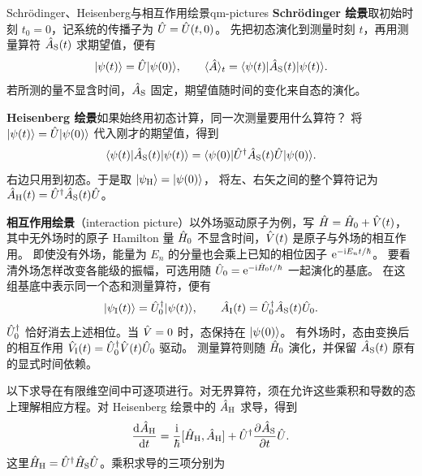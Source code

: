 \begin{definition}{Schrödinger、Heisenberg与相互作用绘景}{qm-pictures}
    \textbf{Schrödinger 绘景}\quad 取初始时刻 $t_0 = 0$，记系统的传播子为 $\hat{U} = \hat{U}(t,0)$。
    先把初态演化到测量时刻 $t$，再用测量算符 $\hat{A}_{\mathrm{S}}(t)$ 求期望值，便有
    \begin{equation}\label{eq:qm-schrodinger-picture}
        \lvert\psi(t)\rangle = \hat{U}\lvert\psi(0)\rangle,\qquad
        \langle\hat{A}\rangle_t = \langle\psi(t)\vert\hat{A}_{\mathrm{S}}(t)\vert\psi(t)\rangle .
    \end{equation}
    若所测的量不显含时间，$\hat{A}_{\mathrm{S}}$ 固定，期望值随时间的变化来自态的演化。

    \smallskip
    \textbf{Heisenberg 绘景}\quad 如果始终用初态计算，同一次测量要用什么算符？
    将 $\lvert\psi(t)\rangle = \hat{U}\lvert\psi(0)\rangle$ 代入刚才的期望值，得到
    \[
        \langle\psi(t)\vert\hat{A}_{\mathrm{S}}(t)\vert\psi(t)\rangle
        = \langle\psi(0)\vert\hat{U}^\dagger\hat{A}_{\mathrm{S}}(t)\hat{U}\vert\psi(0)\rangle .
    \]
    右边只用到初态。于是取 $\lvert\psi_{\mathrm{H}}\rangle = \lvert\psi(0)\rangle$，
    将左、右矢之间的整个算符记为 $\hat{A}_{\mathrm{H}}(t) = \hat{U}^\dagger\hat{A}_{\mathrm{S}}(t)\hat{U}$。

    \smallskip
    \textbf{相互作用绘景}（interaction picture）\quad 以外场驱动原子为例，写 $\hat{H} = \hat{H}_0 + \hat{V}(t)$，
    其中无外场时的原子 Hamilton 量 $\hat{H}_0$ 不显含时间，$\hat{V}(t)$ 是原子与外场的相互作用。
    即使没有外场，能量为 $E_n$ 的分量也会乘上已知的相位因子 $\mathop{}\!\mathrm{e}^{-\mathrm{i} E_n t/\hbar}$。
    要看清外场怎样改变各能级的振幅，可选用随 $\hat{U}_0 = \mathop{}\!\mathrm{e}^{-\mathrm{i}\hat{H}_0t/\hbar}$ 一起演化的基底。
    在这组基底中表示同一个态和测量算符，便有
    \begin{equation}
        \lvert\psi_{\mathrm{I}}(t)\rangle = \hat{U}_0^\dagger\lvert\psi(t)\rangle,\qquad
        \hat{A}_{\mathrm{I}}(t) = \hat{U}_0^\dagger\hat{A}_{\mathrm{S}}(t)\hat{U}_0 .
    \end{equation}
    $\hat{U}_0^\dagger$ 恰好消去上述相位。当 $\hat{V} = 0$ 时，态保持在 $\lvert\psi(0)\rangle$。
    有外场时，态由变换后的相互作用 $\hat{V}_{\mathrm{I}}(t) = \hat{U}_0^\dagger\hat{V}(t)\hat{U}_0$ 驱动。
    测量算符则随 $\hat{H}_0$ 演化，并保留 $\hat{A}_{\mathrm{S}}(t)$ 原有的显式时间依赖。
\end{definition}
以下求导在有限维空间中可逐项进行。对无界算符，须在允许这些乘积和导数的态上理解相应方程。对 Heisenberg 绘景中的 $\hat{A}_{\mathrm{H}}$ 求导，得到
\begin{equation}
    \frac{\mathop{}\!\mathrm{d}^{}\hat{A}_{\mathrm{H}}}{\mathrm{d}{t}^{}} = \frac{\mathrm{i}}\hbar[\hat{H}_{\mathrm{H}},\hat{A}_{\mathrm{H}}] + \hat{U}^\dagger\frac{\partial^{}\hat{A}_{\mathrm{S}}}{\partial{t}^{}}\hat{U}.
    \label{eq:heisenberg}
\end{equation}
这里$\hat{H}_{\mathrm{H}} = \hat{U}^\dagger \hat{H}_{\mathrm{S}}\hat{U}$。乘积求导的三项分别为
